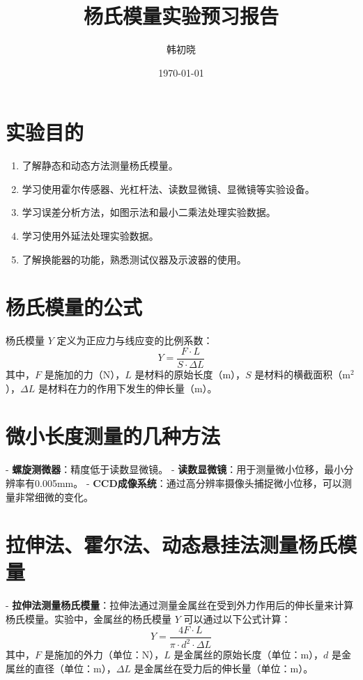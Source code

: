 \documentclass[a4paper,10pt]{article}
\begin{document}
\title{杨氏模量实验预习报告} %
\author{韩初晓} %
\date{\today} %
\maketitle %

\newpage
\section{实验目的}
\begin{enumerate}
    \item 了解静态和动态方法测量杨氏模量。
    \item 学习使用霍尔传感器、光杠杆法、读数显微镜、显微镜等实验设备。
    \item 学习误差分析方法，如图示法和最小二乘法处理实验数据。
    \item 学习使用外延法处理实验数据。
    \item 了解换能器的功能，熟悉测试仪器及示波器的使用。
\end{enumerate}



\section{杨氏模量的公式}
杨氏模量 \(Y\) 定义为正应力与线应变的比例系数：
\[ Y = \frac{F \cdot L}{S \cdot \Delta L} \]
其中，\(F\) 是施加的力（N），\(L\) 是材料的原始长度（m），\(S\) 是材料的横截面积（m\(^2\)），\(\Delta L\) 是材料在力的作用下发生的伸长量（m）。

\section{微小长度测量的几种方法}
- \textbf{螺旋测微器}：精度低于读数显微镜。
- \textbf{读数显微镜}：用于测量微小位移，最小分辨率有0.005mm。
- \textbf{CCD成像系统}：通过高分辨率摄像头捕捉微小位移，可以测量非常细微的变化。

\section{拉伸法、霍尔法、动态悬挂法测量杨氏模量}
- \textbf{拉伸法测量杨氏模量}：拉伸法通过测量金属丝在受到外力作用后的伸长量来计算杨氏模量。实验中，金属丝的杨氏模量 $Y$ 可以通过以下公式计算：
\[ Y = \frac{4F \cdot L}{\pi \cdot d^2 \cdot \Delta L} \]
其中，$F$ 是施加的外力（单位：N），$L$ 是金属丝的原始长度（单位：m），$d$ 是金属丝的直径（单位：m），$\Delta L$ 是金属丝在受力后的伸长量（单位：m）。
\end{document}
